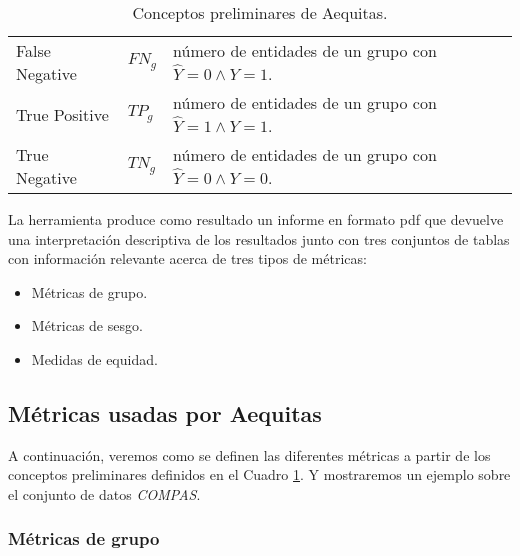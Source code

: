 \begin{table}[h]
{\begin{tabular}{lll}
False Negative       & $FN_g$                               & número de entidades de un grupo con $\hat{Y}=0 \wedge Y=1$.                                     \\
True Positive        & $TP_g$                               & número de entidades de un grupo con $\hat{Y}=1 \wedge Y=1$.                                     \\
True Negative        & $TN_g$                               & número de entidades de un grupo con $\hat{Y}=0 \wedge Y=0$.                                     \\ \hline
\end{tabular}
}
\caption{Conceptos preliminares de Aequitas.}
\label{tab:pretable}
\end{table}

La herramienta produce como resultado un informe en formato pdf que devuelve una interpretación descriptiva de los resultados junto con tres conjuntos de tablas con información relevante acerca de tres tipos de métricas:

\begin{itemize}
    \item Métricas de grupo.
    \item Métricas de sesgo.
    \item Medidas de equidad.
\end{itemize}

\subsection{Métricas usadas por Aequitas}

A continuación, veremos como se definen las diferentes métricas a partir de los conceptos preliminares definidos en el Cuadro \ref{tab:pretable}. Y mostraremos un ejemplo sobre el conjunto de datos \textit{COMPAS}.

\subsubsection{Métricas de grupo}

